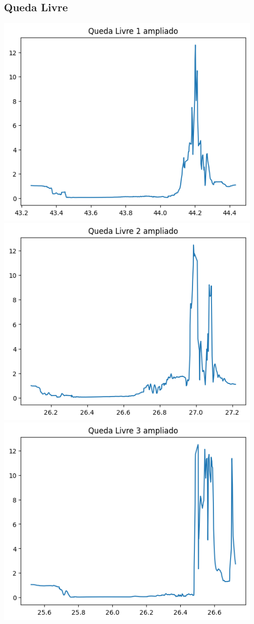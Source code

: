 \documentclass{article}
\begin{document}
\subsection{Queda Livre}
\includegraphics{Q1.png}\\
\includegraphics{Q2.png}\\
\includegraphics{Q3.png}\\
\end{document}

